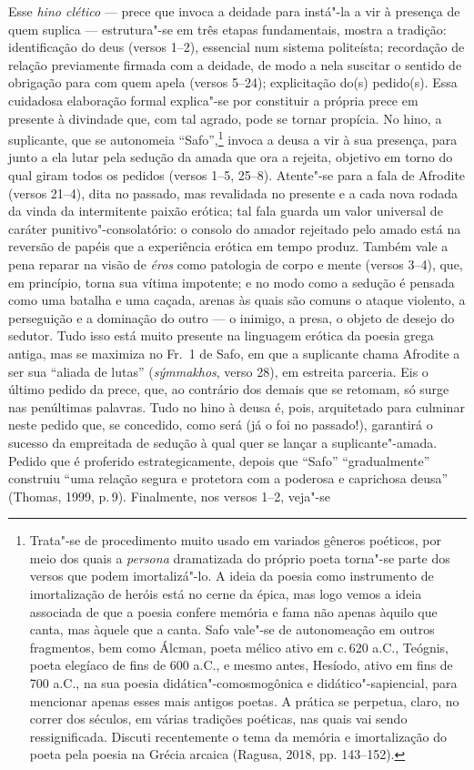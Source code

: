 {\small Esse \textit{hino clético} --- prece que invoca a deidade para instá"-la a vir à
presença de quem suplica --- estrutura"-se em três etapas
fundamentais, mostra a tradição: identificação do deus (versos 1--2), essencial
num sistema politeísta; recordação de relação previamente firmada com a
deidade, de modo a nela suscitar o sentido de obrigação para com quem apela
(versos 5--24); explicitação do(s) pedido(s). Essa cuidadosa elaboração
formal explica"-se por constituir a própria prece em presente à divindade que, com
tal agrado, pode se tornar propícia. No hino, a suplicante, que se autonomeia
“Safo”,\footnote{Trata"-se de procedimento muito usado em variados gêneros poéticos, por meio dos quais a \textit{persona} dramatizada do próprio poeta torna"-se parte dos versos que podem imortalizá"-lo. A ideia da poesia como instrumento de imortalização de heróis está no cerne da épica, mas logo vemos a ideia associada de que a poesia confere memória e fama não apenas àquilo que canta, mas àquele que a canta. Safo vale"-se de autonomeação em outros fragmentos, bem como Álcman, poeta mélico ativo em c.\,620 a.C., Teógnis, poeta elegíaco de fins de 600 a.C., e mesmo antes, Hesíodo, ativo em fins de 700 a.C., na sua poesia didática"-comosmogônica e didático"-sapiencial, para mencionar apenas esses mais antigos poetas. A prática se perpetua, claro, no correr dos séculos, em várias tradições poéticas, nas quais vai sendo ressignificada. Discuti recentemente o tema da memória e imortalização do poeta pela poesia na Grécia arcaica (Ragusa, 2018, pp. 143--152).} invoca a deusa
a vir à sua presença, para junto a ela lutar pela sedução da amada que ora a
rejeita, objetivo em torno do qual giram todos os pedidos (versos 1--5, 25--8).
Atente"-se para a fala de Afrodite (versos 21--4), dita no passado, mas
revalidada no presente e a cada nova rodada da vinda da intermitente paixão
erótica; tal fala guarda um valor universal de caráter punitivo"-consolatório: o
consolo do amador rejeitado pelo amado está na reversão de papéis que a
experiência erótica em tempo produz. Também vale a pena reparar na visão de
\textit{éros} como patologia de corpo e mente (versos 3--4), que, em princípio,
torna sua vítima impotente; e no modo como a sedução é pensada como uma batalha
e uma caçada, arenas às quais são comuns o ataque violento, a perseguição e a
dominação do outro --- o inimigo, a presa, o objeto de desejo do sedutor. Tudo
isso está muito presente na linguagem erótica da poesia grega antiga, mas se
maximiza no Fr.~1 de Safo, em que a suplicante chama Afrodite a ser sua
“aliada de lutas” (\textit{sýmmakhos}, verso 28), em estreita parceria. Eis o último pedido da prece, que, ao contrário dos demais que se retomam, só surge nas penúltimas palavras. Tudo no hino à deusa é, pois, arquitetado para culminar neste pedido que, se concedido, como será (já o foi no passado!), garantirá o sucesso da empreitada de sedução à qual quer se lançar a suplicante"-amada. Pedido que é proferido estrategicamente, depois que ``Safo'' ``gradualmente'' construiu ``uma relação segura e protetora com a poderosa e caprichosa deusa'' (Thomas, 1999, p.\,9). Finalmente, nos versos 1--2, veja"-se
}
